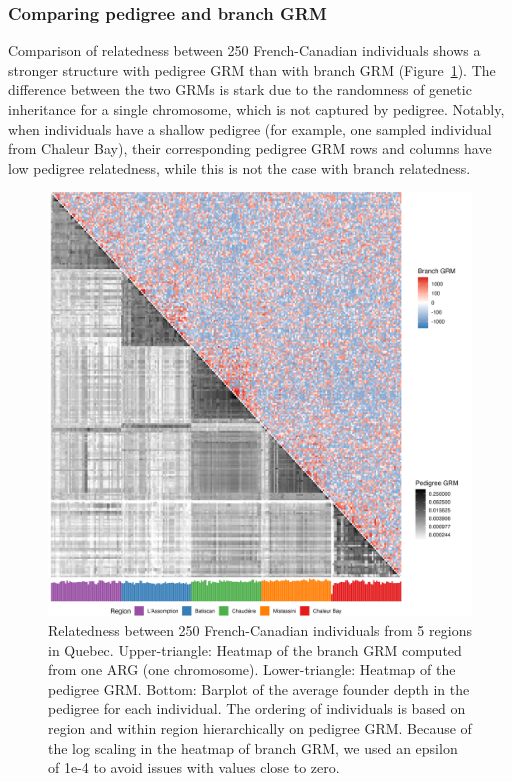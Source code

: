 \subsubsection{Comparing pedigree and branch GRM}

Comparison of relatedness between 250 French-Canadian individuals shows
a stronger structure with pedigree GRM than with branch GRM (Figure~\ref{fig:grm_heatmap}).
%
The difference between the two GRMs is stark
due to the randomness of genetic inheritance for a single chromosome,
which is not captured by pedigree.
%
%
Notably, when individuals have a shallow pedigree
(for example, one sampled individual from Chaleur Bay),
their corresponding pedigree GRM rows and columns have low pedigree relatedness,
while this is not the case with branch relatedness.

\begin{figure}
    \centering
    \includegraphics[width=\textwidth]{Figures/Fig4_grm_prm_heatmaps4.jpg}
    \caption{Relatedness between 250 French-Canadian individuals from 5 regions in Quebec.
      Upper-triangle: Heatmap of the branch GRM computed from one ARG (one chromosome).
      Lower-triangle: Heatmap of the pedigree GRM. 
      Bottom: Barplot of the average founder depth in the pedigree for each individual.
      The ordering of individuals is based on region and within region hierarchically on pedigree GRM.
      Because of the log scaling in the heatmap of branch GRM, we used an epsilon of 1e-4 to avoid issues with values close to zero.
    }
    \label{fig:grm_heatmap}
\end{figure}

